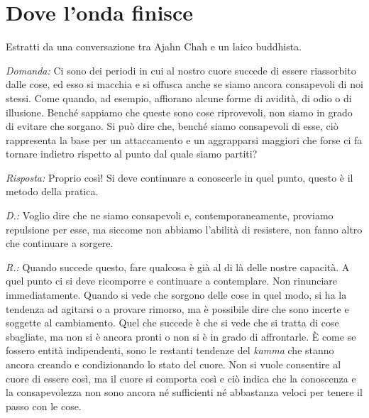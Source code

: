\chapter{Dove l'onda finisce}

\begin{openingQuote}
  \centering

  Estratti da una conversazione tra Ajahn Chah e un laico buddhista.
\end{openingQuote}

\emph{Domanda:} Ci sono dei periodi in cui al nostro cuore succede di essere
riassorbito dalle cose, ed esso si macchia e si offusca anche se siamo
ancora consapevoli di noi stessi. Come quando, ad esempio, affiorano
alcune forme di avidità, di odio o di illusione. Benché sappiamo che
queste sono cose riprovevoli, non siamo in grado di evitare che sorgano.
Si può dire che, benché siamo consapevoli di esse, ciò rappresenta la
base per un attaccamento e un aggrapparsi maggiori che forse ci fa
tornare indietro rispetto al punto dal quale siamo partiti?

\emph{Risposta:} Proprio così! Si deve continuare a conoscerle in quel punto,
questo è il metodo della pratica.

\emph{D.:} Voglio dire che ne siamo consapevoli e, contemporaneamente, proviamo
repulsione per esse, ma siccome non abbiamo l'abilità di resistere, non
fanno altro che continuare a sorgere.

\emph{R.:} Quando succede questo, fare qualcosa è già al di là delle nostre
capacità. A quel punto ci si deve ricomporre e continuare a contemplare.
Non rinunciare immediatamente. Quando si vede che sorgono delle cose in
quel modo, si ha la tendenza ad agitarsi o a provare rimorso, ma è
possibile dire che sono incerte e soggette al cambiamento. Quel che
succede è che si vede che si tratta di cose sbagliate, ma non si è
ancora pronti o non si è in grado di affrontarle. È come se fossero
entità indipendenti, sono le restanti tendenze del \emph{kamma} che
stanno ancora creando e condizionando lo stato del cuore. Non si vuole
consentire al cuore di essere così, ma il cuore si comporta così e ciò
indica che la conoscenza e la consapevolezza non sono ancora né
sufficienti né abbastanza veloci per tenere il passo con le cose.

